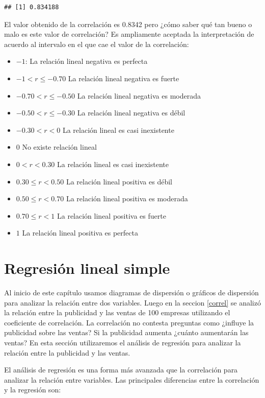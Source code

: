 \documentclass[letterpaper,]{book}
\providecommand{\tightlist}{%
  \setlength{\itemsep}{0pt}\setlength{\parskip}{0pt}}
\begin{document}
\begin{verbatim}
## [1] 0.834188
\end{verbatim}

El valor obtenido de la correlación es 0.8342 pero ¿cómo saber qué tan bueno o malo es este valor de correlación? Es ampliamente aceptada la interpretación de acuerdo al intervalo en el que cae el valor de la correlación:

\begin{itemize}
\tightlist
\item
  \(-1\): La relación lineal negativa es perfecta
\item
  \(-1<r \leq -0.70\) La relación lineal negativa es fuerte
\item
  \(-0.70<r \leq -0.50\) La relación lineal negativa es moderada
\item
  \(-0.50<r \leq -0.30\) La relación lineal negativa es débil
\item
  \(-0.30<r < 0\) La relación lineal es casi inexistente
\item
  \(0\) No existe relación lineal
\item
  \(0<r < 0.30\) La relación lineal es casi inexistente
\item
  \(0.30 \leq r < 0.50\) La relación lineal positiva es débil
\item
  \(0.50 \leq r < 0.70\) La relación lineal positiva es moderada
\item
  \(0.70 \leq r < 1\) La relación lineal positiva es fuerte
\item
  \(1\) La relación lineal positiva es perfecta
\end{itemize}

\hypertarget{lineal}{%
\section{Regresión lineal simple}\label{lineal}}

Al inicio de este capítulo usamos diagramas de dispersión o gráficos de dispersión para analizar la relación entre dos variables. Luego en la seccion \ref{correl} se analizó la relación entre la publicidad y las ventas de 100 empresas utilizando el coeficiente de correlación. La correlación no contesta preguntas como ¿influye la publicidad sobre las ventas? Si la publicidad aumenta ¿cuánto aumentarán las ventas? En esta sección utilizaremos el análisis de regresión para analizar la relación entre la publicidad y las ventas.

El análisis de regresión es una forma más avanzada que la correlación para analizar la relación entre variables. Las principales diferencias entre la correlación y la regresión son:
\end{document}

